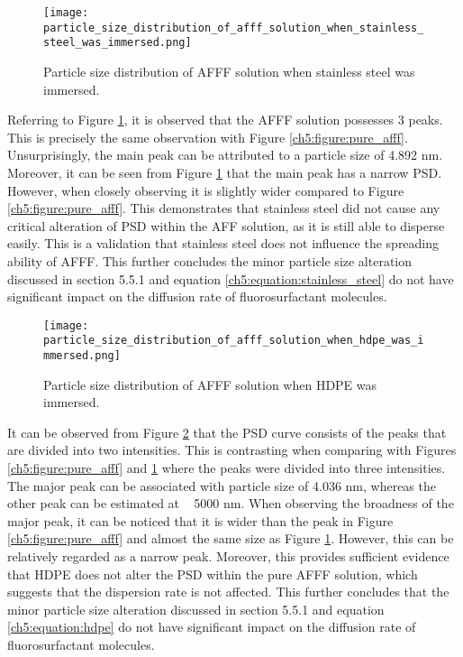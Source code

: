 \begin{figure}[H]
    \centering
    \texttt{[image: particle\_size\_distribution\_of\_afff\_solution\_when\_stainless\_steel\_was\_immersed.png]}
    \caption{Particle size distribution of AFFF solution when stainless steel was immersed.}
    \label{ch5:figure:stainless_steel}
\end{figure}

Referring to Figure \ref{ch5:figure:stainless_steel}, it is observed that the AFFF solution possesses 3 peaks. This is precisely the same observation with Figure \ref{ch5:figure:pure_afff}. Unsurprisingly, the main peak can be attributed to a particle size of 4.892 nm. Moreover, it can be seen from Figure \ref{ch5:figure:stainless_steel} that the main peak has a narrow PSD. However, when closely observing it is slightly wider compared to Figure \ref{ch5:figure:pure_afff}. This demonstrates that stainless steel did not cause any critical alteration of PSD within the AFF solution, as it is still able to disperse easily. This is a validation that stainless steel does not influence the spreading ability of AFFF. This further concludes the minor particle size alteration discussed in section 5.5.1 and equation \ref{ch5:equation:stainless_steel} do not have significant impact on the diffusion rate of fluorosurfactant molecules.     
  
\begin{figure}[H]
    \centering
    \texttt{[image: particle\_size\_distribution\_of\_afff\_solution\_when\_hdpe\_was\_immersed.png]}
    \caption{Particle size distribution of AFFF solution when HDPE was immersed.}
    \label{ch5:figure:hdpe}
\end{figure}

It can be observed from Figure \ref{ch5:figure:hdpe} that the PSD curve consists of the peaks that are divided into two intensities. This is contrasting when comparing with Figures \ref{ch5:figure:pure_afff} and \ref{ch5:figure:stainless_steel} where the peaks were divided into three intensities. The major peak can be associated with particle size of 4.036 nm, whereas the other peak can be estimated at ~ 5000 nm. When observing the broadness of the major peak, it can be noticed that it is wider than the peak in Figure \ref{ch5:figure:pure_afff} and almost the same size as Figure \ref{ch5:figure:stainless_steel}. However, this can be relatively regarded as a narrow peak. Moreover, this provides sufficient evidence that HDPE does not alter the PSD within the pure AFFF solution, which suggests that the dispersion rate is not affected. This further concludes that the minor particle size alteration discussed in section 5.5.1 and equation \ref{ch5:equation:hdpe} do not have significant impact on the diffusion rate of fluorosurfactant molecules.    
  
